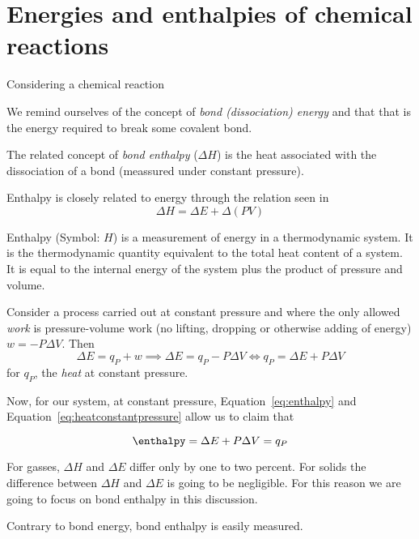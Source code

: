 \documentclass[../mit-general-chemistry.tex]{subfiles}
\begin{document}
\chapter{Energies and enthalpies of chemical reactions}



Considering a chemical reaction


We remind ourselves of the concept of {\em bond (dissociation) energy}
and that that is the energy required to break some covalent bond.


The related concept of {\em bond enthalpy} ($\Delta H$) is the heat
associated with the dissociation of a bond (meassured under constant
pressure).

Enthalpy is closely related to energy through the relation seen in
\begin{equation}\label{eq:enthalpy}
  \Delta H = \Delta E + \Delta(PV)
\end{equation}

Enthalpy (Symbol: $H$) is a measurement of energy in a thermodynamic
system. It is the thermodynamic quantity equivalent to the total heat
content of a system. It is equal to the internal energy of the system
plus the product of pressure and volume.

Consider a process carried out at constant pressure and where the only
allowed {\em work} is pressure-volume work (no lifting, dropping or
otherwise adding of energy) $w = -P\Delta V$. Then
\begin{equation}\label{eq:heatconstantpressure}
  \Delta E = q_P + w
  \implies
  \Delta E = q_P - P\Delta V
  \Leftrightarrow
  q_P = \Delta E + P\Delta V
\end{equation}
for $q_P$, the {\em heat} at constant pressure.

Now, for our system, at constant pressure, Equation~\ref{eq:enthalpy}
and Equation~\ref{eq:heatconstantpressure} allow us to claim that

\begin{equation*}
  \enthalpy = \Delta E + P\Delta V = q_P
\end{equation*}


For gasses, $\Delta H$ and $\Delta E$ differ only by one to two
percent. For solids the difference between $\Delta H$ and $\Delta E$
is going to be negligible. For this reason we are going to focus on
bond enthalpy in this discussion.

Contrary to bond energy, bond enthalpy is easily measured.
\end{document}
